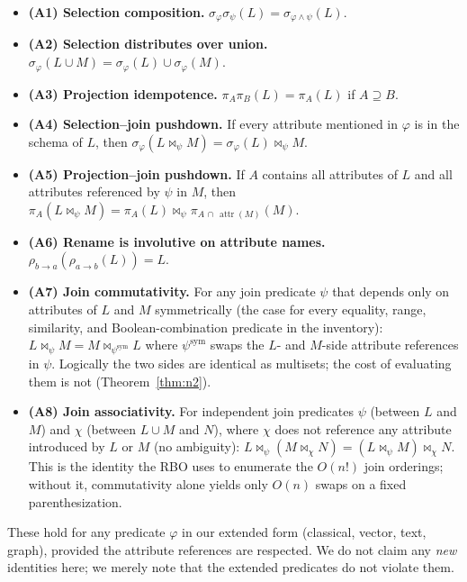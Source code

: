 \documentclass[sigconf,nonacm,review]{acmart}
\theoremstyle{plain}
\theoremstyle{definition}
\newcommand{\attr}[1]{\operatorname{attr}(#1)}
\theoremstyle{remark}
\begin{document}
\begin{itemize}[leftmargin=*]
  \item \textbf{(A1) Selection composition.}
    $\sigma_\varphi \sigma_\psi(L) = \sigma_{\varphi \wedge \psi}(L)$.
  \item \textbf{(A2) Selection distributes over union.}
    $\sigma_\varphi(L \cup M) = \sigma_\varphi(L) \cup \sigma_\varphi(M)$.
  \item \textbf{(A3) Projection idempotence.}
    $\pi_A \pi_B(L) = \pi_A(L)$ if $A \supseteq B$.
  \item \textbf{(A4) Selection--join pushdown.} If every attribute
    mentioned in $\varphi$ is in the schema of $L$, then
    $\sigma_\varphi(L \bowtie_\psi M) = \sigma_\varphi(L) \bowtie_\psi M$.
  \item \textbf{(A5) Projection--join pushdown.} If $A$ contains all
    attributes of $L$ and all attributes referenced by $\psi$ in $M$,
    then $\pi_A(L \bowtie_\psi M) = \pi_A(L) \bowtie_\psi
    \pi_{A \,\cap\, \attr{M}}(M)$.
  \item \textbf{(A6) Rename is involutive on attribute names.}
    $\rho_{b\to a}(\rho_{a\to b}(L)) = L$.
  \item \textbf{(A7) Join commutativity.} For any join predicate
    $\psi$ that depends only on attributes of $L$ and $M$
    symmetrically (the case for every equality, range, similarity,
    and Boolean-combination predicate in the inventory):
    $L \bowtie_\psi M = M \bowtie_{\psi^{\mathrm{sym}}} L$ where
    $\psi^{\mathrm{sym}}$ swaps the $L$- and $M$-side attribute
    references in $\psi$. Logically the two sides are identical as
    multisets; the cost of evaluating them is not
    (Theorem~\ref{thm:n2}).
  \item \textbf{(A8) Join associativity.} For independent join
    predicates $\psi$ (between $L$ and $M$) and $\chi$ (between
    $L \cup M$ and $N$), where $\chi$ does not reference any
    attribute introduced by $L$ or $M$ (no ambiguity):
    $L \bowtie_\psi (M \bowtie_\chi N) = (L \bowtie_\psi M) \bowtie_\chi N$.
    This is the identity the RBO uses to enumerate the $O(n!)$ join
    orderings; without it, commutativity alone yields only $O(n)$
    swaps on a fixed parenthesization.
\end{itemize}

These hold for any predicate $\varphi$ in our extended form
(classical, vector, text, graph), provided the attribute references
are respected. We do not claim any \emph{new} identities here; we
merely note that the extended predicates do not violate them.
\end{document}
